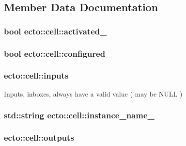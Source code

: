 \subsection{Member Data Documentation}
\hypertarget{structecto_1_1cell_ad270620c006f30471b2371feb38b6a03}{
\subsubsection[{activated\-\_\-}]{\setlength{\rightskip}{0pt plus 5cm}bool ecto\-::cell\-::activated\-\_\-\hspace{0.3cm}{\ttfamily [private]}}}\label{structecto_1_1cell_ad270620c006f30471b2371feb38b6a03}
\hypertarget{structecto_1_1cell_a187d36610ae8035e9f589de06ecc0d0a}{
\subsubsection[{configured\-\_\-}]{\setlength{\rightskip}{0pt plus 5cm}bool ecto\-::cell\-::configured\-\_\-\hspace{0.3cm}{\ttfamily [private]}}}\label{structecto_1_1cell_a187d36610ae8035e9f589de06ecc0d0a}
\hypertarget{structecto_1_1cell_a65099b0458a7761b8bfa7a1ddc17e92f}{
\subsubsection[{inputs}]{ ecto\-::cell\-::inputs}}\label{structecto_1_1cell_a65099b0458a7761b8bfa7a1ddc17e92f}


Inputs, inboxes, always have a valid value ( may be N\-U\-L\-L ) 

\hypertarget{structecto_1_1cell_a2bf4e65c7a699624c61d3b55cfac45ed}{
\subsubsection[{instance\-\_\-name\-\_\-}]{\setlength{\rightskip}{0pt plus 5cm}std\-::string ecto\-::cell\-::instance\-\_\-name\-\_\-\hspace{0.3cm}{\ttfamily [private]}}}\label{structecto_1_1cell_a2bf4e65c7a699624c61d3b55cfac45ed}
\hypertarget{structecto_1_1cell_a93951743b603faba35312ebdb07ceb22}{
\subsubsection[{outputs}]{ ecto\-::cell\-::outputs}}\label{structecto_1_1cell_a93951743b603faba35312ebdb07ceb22}


